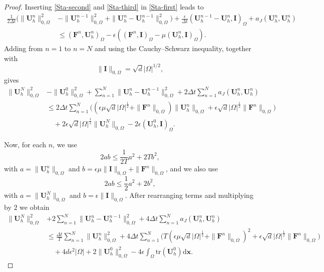 \documentclass[final,12pt]{amsart}
\theoremstyle{plain}
\theoremstyle{definition}
\newcommand\bx{\boldsymbol{x}}
\begin{document}
\begin{proof}
	Inserting \eqref{Sta-second} and \eqref{Sta-third} in \eqref{Sta-first} leads to
	\begin{align*}
	\frac{1}{2 \Delta t} \Big(\| \mathbf{U}_{h}^{n} \|_{0,\Omega}^{2}
	&- \| \mathbf{U}_{h}^{n-1} \|_{0,\Omega}^{2}
	+ \| \mathbf{U}_{h}^{n} - \mathbf{U}_{h}^{n-1} \|_{0,\Omega}^{2}\Big)
	+\frac{\epsilon}{\Delta t} (\mathbf{U}_{h}^{n-1} - \mathbf{U}_{h}^{n}, \mathbf{I})_{\Omega}
	+ a_{J}(\mathbf{U}_{h}^{n}, \mathbf{U}_{h}^{n})
	\\
	&\leq (\mathbf{F}^{n}, \mathbf{U}_{h}^{n})_{\Omega}
	-\epsilon \left( (\mathbf{F}^{n}, \mathbf{I})_{\Omega}-\mu( \mathbf{U}_{h}^{n},\mathbf{I})_{\Omega} \right).
	\end{align*}
	Adding from $n=1$ to $n=N$ and using the Cauchy--Schwarz inequality, together with
	\[
	\|\mathbf{I}\|_{0,\Omega}= \sqrt{d} |\Omega|^{1/2},
	\]
	gives
	\begin{align*}
	\| \mathbf{U}_{h}^{N} \|_{0,\Omega}^{2}
	&- \| \mathbf{U}_{h}^{0} \|_{0,\Omega}^{2}
	+ \sum_{n=1}^{N}\| \mathbf{U}_{h}^{n} - \mathbf{U}_{h}^{n-1} \|_{0,\Omega}^{2}
	+  2 \Delta t\sum_{n=1}^{N} a_{J}(\mathbf{U}_{h}^{n}, \mathbf{U}_{h}^{n})
	\\
	&\leq 2 \Delta t \sum_{n=1}^{N}\Big(
	(\epsilon\mu \sqrt{d} \lvert \Omega \rvert^{\frac{1}{2}}+\|\mathbf{F}^{n}\|_{0,\Omega}) \| \mathbf{U}_{h}^{n}\|_{0,\Omega}
	+\epsilon \sqrt{d}\lvert \Omega \rvert^{\frac{1}{2}}\|\mathbf{F}^{n}\|_{0,\Omega}\Big)
	\\
	&\quad
	+2\epsilon \sqrt{d}\lvert \Omega \rvert^{\frac{1}{2}}  \| \mathbf{U}_{h}^{N}\|_{0,\Omega}
	-2\epsilon(\mathbf{U}_{h}^{0} , \mathbf{I})_{\Omega}.
	\end{align*}

        Now, for each $n$, we use
	\[
	2ab \le \frac{1}{2T}a^2 + 2T b^2,
	\]
	with $a=\|\mathbf{U}_h^n\|_{0,\Omega}$ and $b=\epsilon\mu \|\mathbf{I}\|_{0,\Omega}+\|\mathbf{F}^n\|_{0,\Omega}$, and we also use
	\[
	2ab \le \frac12 a^2 + 2 b^2,
	\]
	with $a=\|\mathbf{U}_h^N\|_{0,\Omega}$ and $b=\epsilon\|\mathbf{I}\|_{0,\Omega}$.
	After rearranging terms and multiplying by $2$ we obtain
	\begin{align*}
	\| \mathbf{U}_{h}^{N} \|_{0,\Omega}^{2}
	&+ 2\sum_{n=1}^{N}\| \mathbf{U}_{h}^{n} - \mathbf{U}_{h}^{n-1} \|_{0,\Omega}^{2}
	+ 4 \Delta t\sum_{n=1}^{N} a_{J}(\mathbf{U}_{h}^{n}, \mathbf{U}_{h}^{n})
	\\
	&\leq \frac{\Delta t}{T}\sum_{n=1}^{N}\| \mathbf{U}_{h}^{n}\|_{0,\Omega}^{2}
	+4\Delta t\sum_{n=1}^{N}\Big(
	T(\epsilon\mu \sqrt{d}\lvert \Omega \rvert^{\frac{1}{2}}+\|\mathbf{F}^{n}\|_{0,\Omega})^{2}
	+\epsilon \sqrt{d} \lvert \Omega \rvert^{\frac{1}{2}}\|\mathbf{F}^{n}\|_{0,\Omega}\Big)
	\\
	&\quad
	+4d\epsilon^{2}\lvert \Omega \rvert
	+2\|\mathbf{U}_{h}^{0}\|_{0,\Omega}^{2}
	-4\epsilon\int_\Omega\mathrm{tr}(\mathbf{U}_{h}^{0}) \mathrm{d}\bx.
	\end{align*}


\end{proof}
\end{document}
